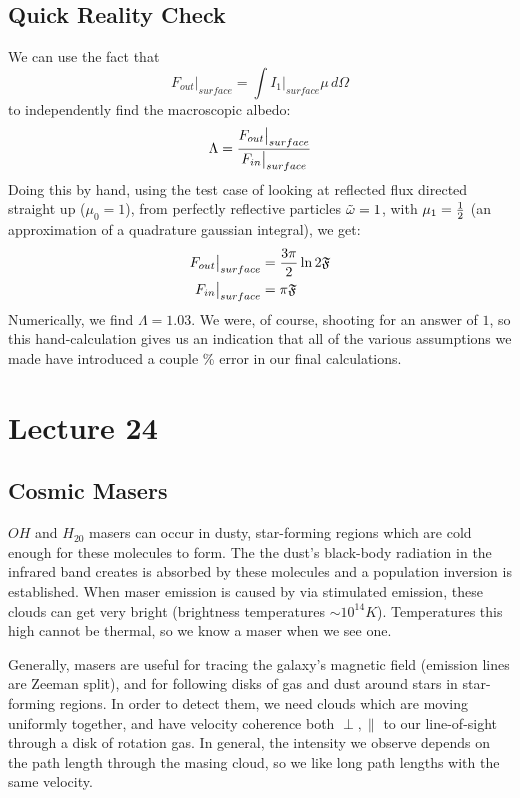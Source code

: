 \documentclass[11pt]{article}
\def\hf{{1 \over 2}}
\def\eval#1{\big|_{#1}}
\begin{document}
\subsection*{ Quick Reality Check }

We can use the fact that 
$$F_{out}\eval{surface}=\int{I_1\eval{surface}\mu\,d\Omega}$$
to independently find the macroscopic albedo:
$$\Lambda={F_{out}\eval{surface}\over F_{in}\eval{surface}}$$
Doing this by hand, using the test case of looking at reflected flux directed
straight up ($\mu_0=1$), from perfectly reflective particles ${\tilde\omega}=1$, with
$\mu_1=\hf$ (an approximation of a quadrature gaussian integral), we get:
$$\begin{aligned}F_{out}\eval{surface}&={3\pi\over2}\ln2\mathfrak{F}\\ 
F_{in}\eval{surface}&=\pi\mathfrak{F}\\ \end{aligned}$$
Numerically, we find $\Lambda=1.03$.  We were, of course, shooting for an
answer of $1$, so this hand-calculation gives us an indication that all of
the various assumptions we made have introduced a couple \% error in our
final calculations.

\section*{ Lecture 24 }

\subsection*{ Cosmic Masers }

$OH$ and $H_20$ masers can occur in dusty, star-forming regions which are cold
enough for these molecules to form.  The the dust's black-body radiation in
the infrared band creates is absorbed by these molecules and a population
inversion is established.  When maser emission is caused by via stimulated
emission, these clouds can get very bright (brightness temperatures $\sim
10^{14}K$).  Temperatures this high cannot be thermal, so we know a maser
when we see one. \par
Generally, masers are useful for tracing the galaxy's magnetic field (emission
lines are Zeeman split), and for following disks of gas and dust around stars
in star-forming regions.  In order to detect them, we need clouds which are
moving uniformly together, and have velocity coherence both $\perp, \|$ to
our line-of-sight through a disk of rotation gas.  
In general, the intensity we observe depends on the
path length through the masing cloud, so we like long path lengths with the
same velocity.
\end{document}
